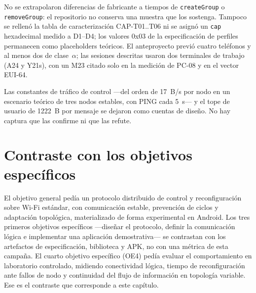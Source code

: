 \documentclass[12pt,oneside]{scrreprt}
\begin{document}
No se extrapolaron diferencias de fabricante a tiempos de \texttt{createGroup} o \texttt{removeGroup}: el repositorio no conserva una muestra que los sostenga. Tampoco se rellenó la tabla de caracterización CAP-T01..T06 ni se asignó un \texttt{cap} hexadecimal medido a D1--D4; los valores 0x03 de la especificación de perfiles permanecen como placeholders teóricos. El anteproyecto previó cuatro teléfonos y al menos dos de clase~$\alpha$; las sesiones descritas usaron dos terminales de trabajo (A24 y Y21s), con un M23 citado solo en la medición de PC-08 y en el vector EUI-64.

Las constantes de tráfico de control ---del orden de 17~B/s por nodo en un escenario teórico de tres nodos estables, con PING cada 5~s--- y el tope de usuario de 1222~B por mensaje se dejaron como cuentas de diseño. No hay captura que las confirme ni que las refute.

\section{Contraste con los objetivos específicos}

El objetivo general pedía un protocolo distribuido de control y reconfiguración sobre Wi-Fi estándar, con comunicación estable, prevención de ciclos y adaptación topológica, materializado de forma experimental en Android. Los tres primeros objetivos específicos ---diseñar el protocolo, definir la comunicación lógica e implementar una aplicación demostrativa--- se contrastan con los artefactos de especificación, biblioteca y APK, no con una métrica de esta campaña. El cuarto objetivo específico (OE4) pedía evaluar el comportamiento en laboratorio controlado, midiendo conectividad lógica, tiempo de reconfiguración ante fallos de nodo y continuidad del flujo de información en topología variable. Ese es el contraste que corresponde a este capítulo.
\end{document}
